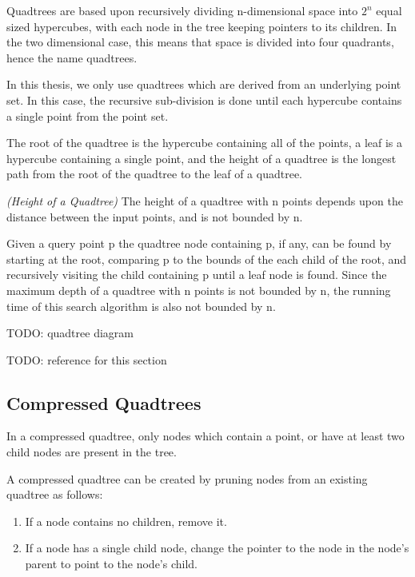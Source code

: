 \documentclass[mcs]{scsthesis}
\begin{document}
Quadtrees are based upon recursively dividing n-dimensional space into \(2^n\)
equal sized hypercubes, with each node in the tree keeping pointers to its
children.  In the two dimensional case, this means that space is divided into
four quadrants, hence the name quadtrees.  

In this thesis, we only use quadtrees which are derived from an underlying point
set.  In this case, the recursive sub-division is done until each hypercube
contains a single point from the point set.

The root of the quadtree is the hypercube containing all of the points, a leaf
is a hypercube containing a single point, and the height of a quadtree
is the longest path from the root of the quadtree to the leaf of a quadtree.

\begin{thm} \emph{(Height of a Quadtree)}
The height of a quadtree with n points depends upon the distance between
the input points, and is not bounded by n.
\end{thm}

Given a query point p the quadtree node containing p, if any, can be found by
starting at the root, comparing p to the bounds of the each child of the root,
and recursively visiting the child containing p until a leaf node is found.  
Since the maximum depth of a quadtree with n points is not bounded by n, the
running time of this search algorithm is also not bounded by n. 

TODO: quadtree diagram

TODO: reference for this section

\subsection{Compressed Quadtrees}

In a compressed quadtree, only nodes which contain a point, or have at least
two child nodes are present in the tree.

A compressed quadtree can be created by pruning nodes from an existing quadtree
as follows:

\begin{enumerate}
\item If a node contains no children, remove it.
\item If a node has a single child node, change the pointer to the node in the
node's parent to point to the node's child.
\end{enumerate}
\end{document}
